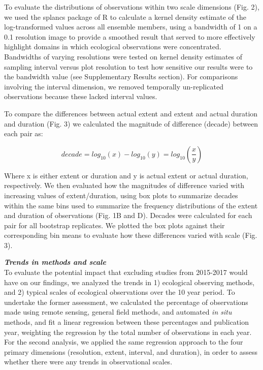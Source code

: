 \documentclass[12pt]{article}
\begin{document}
To evaluate the distributions of observations within two scale dimensions (Fig. 2), we used the splancs package \cite{rowlingson_splancs:_1993} of R \cite{r_development_core_team_r:_2011} to calculate a kernel density estimate of the log-transformed values across all ensemble members, using a bandwidth of 1 on a 0.1 resolution image to provide a smoothed result that served to more effectively highlight domains in which ecological observations were concentrated. Bandwidths of varying resolutions were tested on kernel density estimates of sampling interval versus plot resolution to test how sensitive our results were to the bandwidth value (see Supplementary Results section). For comparisons involving the interval dimension, we removed temporally un-replicated observations because these lacked interval values. 

To compare the differences between actual extent and extent and actual duration and duration (Fig. 3) we calculated the magnitude of difference (decade) between each pair as:

\begin{equation}
decade = log_{10}(x) - log_{10}(y) = log_{10}\left(\frac{x}{y}\right)
\end{equation}

\noindent Where x is either extent or duration and y is actual extent or actual duration, respectively. We then evaluated how the magnitudes of difference varied with increasing values of extent/duration, using box plots to summarize decades within the same bins used to summarize the frequency distributions of the extent and duration of observations (Fig. 1B and D). Decades were calculated for each pair for all bootstrap replicates. We plotted the box plots against their corresponding bin means to evaluate how these differences varied with scale (Fig. 3).

\vspace{5pt}
\noindent \textbf{\emph{Trends in methods and scale}}\\
To evaluate the potential impact that excluding studies from 2015-2017 would have on our findings, we analyzed the trends in 1) ecological observing methods, and 2) typical scales of ecological observations over the 10 year period. To undertake the former assessment, we calculated the percentage of observations made using remote sensing, general field methods, and automated \emph{in situ} methods, and fit a linear regression between these percentages and publication year, weighting the regression by the total number of observations in each year. For the second analysis, we applied the same regression approach to the four primary dimensions (resolution, extent, interval, and duration), in order to assess whether there were any trends in observational scales.  
\end{document}
